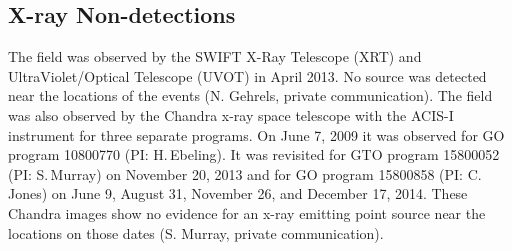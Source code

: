 \subsection{X-ray Non-detections}\label{sec:Xray}

The  field was observed by the SWIFT X-Ray Telescope (XRT) and
UltraViolet/Optical Telescope (UVOT) in April 2013.  No source was
detected near the locations of the \spock events (N. Gehrels, private
communication).  The field was also observed by the Chandra x-ray
space telescope with the ACIS-I instrument for three separate
programs.  On June 7, 2009 it was observed for GO program 10800770
(PI: H.\,Ebeling).  It was revisited for GTO program 15800052 (PI:
S.\,Murray) on November 20, 2013 and for GO program 15800858 (PI: C.\,
Jones) on June 9, August 31, November 26, and December 17, 2014. These
Chandra images show no evidence for an x-ray emitting point source
near the \spock locations on those dates (S. Murray, private
communication). 
